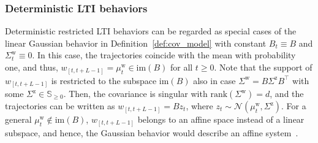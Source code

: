 \documentclass[letterpaper, 10 pt, conference]{ieeeconf}
\def\mw{\mu^\mathrm{w}_t}
\def\Sw{\Sigma^\mathrm{w}}
\begin{document}
\subsubsection{Deterministic \gls{LTI} behaviors}
Deterministic restricted \gls{LTI} behaviors can be regarded as special cases of the linear Gaussian behavior in Definition~\ref{def:cov_model} with constant $B_t\equiv B$ and $\Sw_t \equiv 0$.
In this case, the trajectories coincide with the mean with probability one, and thus, $w_{[t,t+L-1]} = \mw \in \mathrm{im}(B)$ for all $t\geq0$.
Note that the support of $w_{[t,t+L-1]}$ is restricted to the subspace $\mathrm{im}(B)$ also in case $\Sw =B\Sigma^\mathrm{z}B^\top$ with some $\Sigma^\mathrm{z}\in\mathbb{S}_{\geq0}$. 
Then, the covariance is singular with $\mathrm{rank}(\Sw) = d$, and the trajectories can be written as $w_{[t,t+L-1]} = Bz_t$, where $z_t\sim\mathcal{N}(\mw,\Sigma^\mathrm{z})$.
For a general $\mw\notin\mathrm{im}(B)$, $w_{[t,t+L-1]}$ belongs to an affine space instead of a linear subspace, and hence, the Gaussian behavior would describe an affine system~\cite{padoan2023data}.
\end{document}

